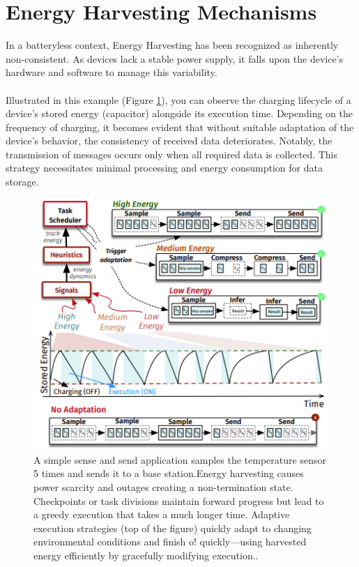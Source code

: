     
\section{Energy Harvesting Mechanisms}
    In a \gls{batteryless} context, Energy Harvesting has been recognized as inherently non-consistent. As devices lack a stable power supply, it falls upon the device's hardware and software to manage this variability.

    \paragraph{}
        Illustrated in this example (Figure \ref{fig:energy-harvesting}), you can observe the charging lifecycle of a device's stored energy (capacitor) alongside its execution time. Depending on the frequency of charging, it becomes evident that without suitable adaptation of the device's behavior, the consistency of received data deteriorates. Notably, the transmission of messages occurs only when all required data is collected. This strategy necessitates minimal processing and energy consumption for data storage.

    \begin{figure}[htbp]
        \centering
        \includegraphics[width=1\textwidth]{img/chap2/Figure - simple sense and send application .png}
        \caption{A simple sense and send application samples the temperature sensor 5 times and sends it to a base station.Energy harvesting causes power scarcity and outages creating a non-termination state. Checkpoints or task divisions maintain forward progress but lead to a greedy execution that takes a much longer time. Adaptive execution strategies (top of the figure) quickly adapt to changing environmental conditions and finish o! quickly—using harvested energy efficiently by gracefully modifying execution.\cite{basedArticle}.}
        \label{fig:energy-harvesting}
    \end{figure}


